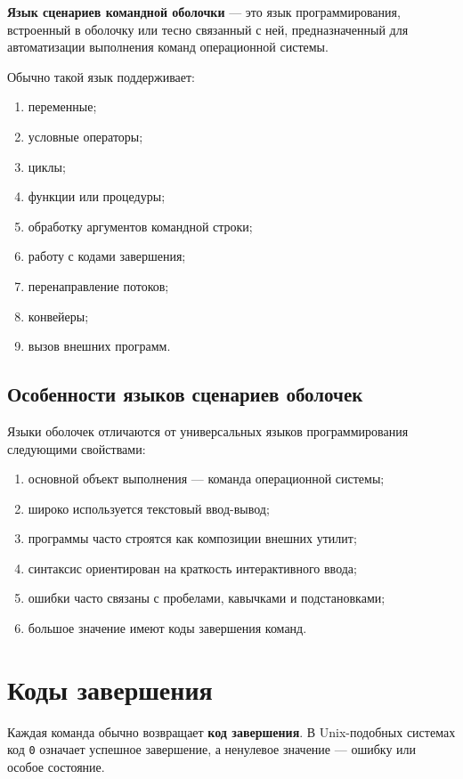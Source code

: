 \documentclass[12pt,a4paper]{article}
\begin{document}
\textbf{Язык сценариев командной оболочки} --- это язык программирования, встроенный в оболочку или тесно связанный с ней, предназначенный для автоматизации выполнения команд операционной системы.

Обычно такой язык поддерживает:
\begin{enumerate}
    \item переменные;
    \item условные операторы;
    \item циклы;
    \item функции или процедуры;
    \item обработку аргументов командной строки;
    \item работу с кодами завершения;
    \item перенаправление потоков;
    \item конвейеры;
    \item вызов внешних программ.
\end{enumerate}

\subsection{Особенности языков сценариев оболочек}

Языки оболочек отличаются от универсальных языков программирования следующими свойствами:
\begin{enumerate}
    \item основной объект выполнения --- команда операционной системы;
    \item широко используется текстовый ввод-вывод;
    \item программы часто строятся как композиции внешних утилит;
    \item синтаксис ориентирован на краткость интерактивного ввода;
    \item ошибки часто связаны с пробелами, кавычками и подстановками;
    \item большое значение имеют коды завершения команд.
\end{enumerate}

\section{Коды завершения}

Каждая команда обычно возвращает \textbf{код завершения}. В Unix-подобных системах код \texttt{0} означает успешное завершение, а ненулевое значение --- ошибку или особое состояние.
\end{document}
